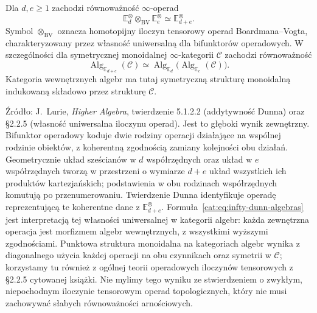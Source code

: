 \begin{twierdzenie}\label{cat:thm:infty-dunn-additivity}
Dla $d,e\geq1$ zachodzi równoważność $\infty$-operad
\[
 \mathbb E_d^\otimes\otimes_{\mathrm{BV}}\mathbb E_e^\otimes
 \simeq\mathbb E_{d+e}^\otimes.
\]
Symbol $\otimes_{\mathrm{BV}}$ oznacza homotopijny iloczyn tensorowy operad Boardmana--Vogta, charakteryzowany przez własność uniwersalną dla bifunktorów operadowych. W szczególności dla symetrycznej monoidalnej $\infty$-kategorii $\mathcal C$ zachodzi równoważność
\begin{equation}\label{cat:eq:infty-dunn-algebras}
 \operatorname{Alg}_{\mathbb E_{d+e}}(\mathcal C)
 \simeq
 \operatorname{Alg}_{\mathbb E_d}
 \bigl(\operatorname{Alg}_{\mathbb E_e}(\mathcal C)\bigr).
\end{equation}
Kategoria wewnętrznych algebr ma tutaj symetryczną strukturę monoidalną indukowaną składowo przez strukturę $\mathcal C$.
\end{twierdzenie}

Źródło: J.~Lurie, \emph{Higher Algebra}, twierdzenie 5.1.2.2 (addytywność Dunna) oraz \S2.2.5 (własność uniwersalna iloczynu operad). Jest to głęboki wynik zewnętrzny. Bifunktor operadowy koduje dwie rodziny operacji działające na wspólnej rodzinie obiektów, z koherentną zgodnością zamiany kolejności obu działań. Geometrycznie układ sześcianów w $d$ współrzędnych oraz układ w $e$ współrzędnych tworzą w przestrzeni o wymiarze $d+e$ układ wszystkich ich produktów kartezjańskich; podstawienia w obu rodzinach współrzędnych komutują po przenumerowaniu. Twierdzenie Dunna identyfikuje operadę reprezentującą te koherentne dane z $\mathbb E_{d+e}^\otimes$. Formuła~\eqref{cat:eq:infty-dunn-algebras} jest interpretacją tej własności uniwersalnej w kategorii algebr: każda zewnętrzna operacja jest morfizmem algebr wewnętrznych, z wszystkimi wyższymi zgodnościami. Punktowa struktura monoidalna na kategoriach algebr wynika z diagonalnego użycia każdej operacji na obu czynnikach oraz symetrii w $\mathcal C$; korzystamy tu również z ogólnej teorii operadowych iloczynów tensorowych z \S2.2.5 cytowanej książki. Nie mylimy tego wyniku ze stwierdzeniem o zwykłym, niepochodnym iloczynie tensorowym operad topologicznych, który nie musi zachowywać słabych równoważności arnościowych.

